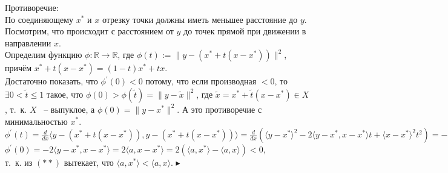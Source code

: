 \noindent Противоречие:\\

\noindent По соединяющему $x^{\ast}$ и $x$ отрезку точки должны иметь меньшее расстояние до $y$.\\
Посмотрим, что происходит с расстоянием от $y$ до точек прямой при движении в направлении $x$.\\

\noindent Определим функцию $\phi : \mathbb{R} \rightarrow \mathbb{R} $, где  $\phi (t):= \parallel y-(x^{\ast} +t(x-x^{\ast}))\parallel ^2$, причём $x^{\ast} +t(x-x^{\ast}) = (1-t)x^{\ast}+tx$.\\
Достаточно показать, что $\phi ^\prime (0)<0$ потому, что если производная $<0$, то $\exists 0<\tilde{t}\leq 1$ такое, что $\phi (0)>\phi (\tilde{t}) = \parallel y- \tilde{x} \parallel ^2$, где $\tilde{x} = x^{\ast} + \tilde{t}(x-x^{\ast}) \in X$, т.~к. $X$ ~-- выпуклое, а $\phi (0)=\parallel y-x^{\ast} \parallel ^2$. А это противоречие с минимальностью $x^{\ast}$.\\

\noindent$\phi ^\prime (t) = \frac{\textit{d}}{\textit{d}x} \langle y-(x^{\ast}+t(x-x^{\ast})),y-(x^{\ast}+t(x-x^{\ast}))\rangle = \frac{\textit{d}}{\textit{d}x} (\langle y-x^{\ast} \rangle ^{2} - 2 \langle y-x^{\ast},x-x^{\ast}\rangle t + \langle x-x^{\ast}\rangle ^{2} t^{2}) = -2\langle y-x^{\ast},x-x^{\ast}\rangle + 2 \langle x-x^{\ast}\rangle^{2} t$ \\

\noindent $\phi^\prime (0) = -2 \langle y-x^{\ast},x-x^{\ast}\rangle = 2 \langle a,x-x^{\ast}\rangle = 2 (\langle a,x^{\ast}\rangle - \langle a,x\rangle) < 0$,\\
т.~к. из $(\ast\ast)$ вытекает, что $\langle a,x^{\ast}\rangle < \langle a,x\rangle $. $\blacktriangleright$\\


